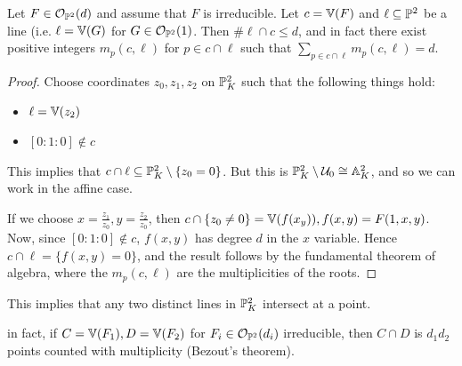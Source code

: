 \documentclass[10pt,a4paper,rgb]{article}
\begin{document}
\begin{proposition}
Let $F \in \mathcal{O}_{\P^2} (d)$ and assume that $F$ is irreducible. Let $c = \V(F)$ and $\ell \subseteq \P^2$ be a line (i.e. $\ell = \V(G)$ for $G \in \mathcal{O}_{\P^2}(1)$. Then $\#\ell \cap c \leq d$, and in fact there exist positive integers $m_p(c, \ell)$ for $p \in c\cap \ell$ such that $\sum_{p \in c\cap\ell} m_p(c, \ell) = d$.
\end{proposition}
\begin{proof}
Choose coordinates $z_0, z_1, z_2$ on $\P^2_K$ such that the following things hold:
\begin{itemize}
\item $\ell = \V(z_2)$
\item $[0:1:0] \notin c$
\end{itemize}
This implies that $c \cap \ell \subseteq \P_K^2 \setminus \{z_0 = 0\}$. But this is $\P_K^2 \setminus \mathcal{U}_0 \cong \mathbb{A}^2_K$, and so we can work in the affine case.

If we choose $x = \frac{z_1}{z_0}, y = \frac{z_2}{z_0}$, then $c \cap \{z_0 \neq 0\} = \V(f(x_y)), f(x,y) = F(1,x,y)$. Now, since $[0:1:0] \notin c$, $f(x,y)$ has degree $d$ in the $x$ variable. Hence $c\cap \ell = \{f(x,y) = 0\}$, and the result follows by the fundamental theorem of algebra, where the $m_p(c, \ell)$ are the multiplicities of the roots.
\end{proof}
This implies that any two distinct lines in $\P^2_K$ intersect at a point.

in fact, if $C = \V(F_1), D = \V(F_2)$ for $F_i \in \mathcal{O}_{\P^2}(d_i)$ irreducible, then $C \cap D$ is $d_1d_2$ points counted with multiplicity (Bezout's theorem).
\end{document}
